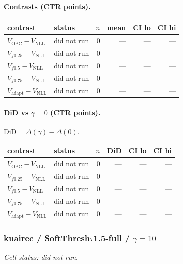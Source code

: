 \documentclass[10pt,a4paper]{article}
\begin{document}
\paragraph{Contrasts (CTR points).}
{\centering\small\begin{tabular}{llrrrr}
\toprule contrast & status & $n$ & mean & CI lo & CI hi \\
\midrule
$V_{\mathrm{OPC}}-V_{\mathrm{NLL}}$ & did not run & 0 & --- & --- & --- \\
$V_{f0.25}-V_{\mathrm{NLL}}$ & did not run & 0 & --- & --- & --- \\
$V_{f0.5}-V_{\mathrm{NLL}}$ & did not run & 0 & --- & --- & --- \\
$V_{f0.75}-V_{\mathrm{NLL}}$ & did not run & 0 & --- & --- & --- \\
$V_{\mathrm{adapt}}-V_{\mathrm{NLL}}$ & did not run & 0 & --- & --- & --- \\
\bottomrule\end{tabular}\par}
\paragraph{DiD vs $\gamma=0$ (CTR points).} $\mathrm{DiD}=\Delta(\gamma)-\Delta(0)$.
{\centering\small\begin{tabular}{llrrrr}
\toprule contrast & status & $n$ & DiD & CI lo & CI hi \\
\midrule
$V_{\mathrm{OPC}}-V_{\mathrm{NLL}}$ & did not run & 0 & --- & --- & --- \\
$V_{f0.25}-V_{\mathrm{NLL}}$ & did not run & 0 & --- & --- & --- \\
$V_{f0.5}-V_{\mathrm{NLL}}$ & did not run & 0 & --- & --- & --- \\
$V_{f0.75}-V_{\mathrm{NLL}}$ & did not run & 0 & --- & --- & --- \\
$V_{\mathrm{adapt}}-V_{\mathrm{NLL}}$ & did not run & 0 & --- & --- & --- \\
\bottomrule\end{tabular}\par}
\bigskip
\subsubsection{kuairec / SoftThresh$\tau$1.5-full / $\gamma=10$}
\emph{Cell status: did not run}.
\end{document}
